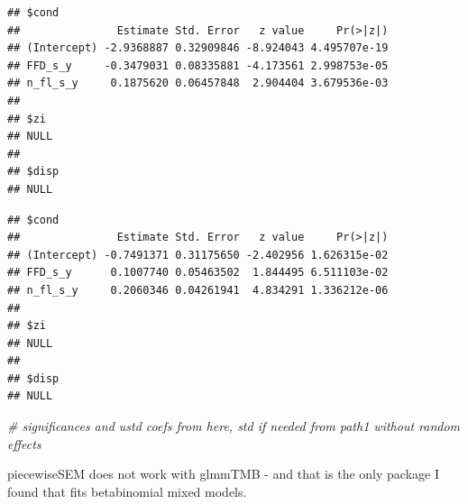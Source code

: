 \documentclass[
]{article}
\newenvironment{Shaded}{\begin{snugshade}}{\end{snugshade}}
\newcommand{\CommentTok}[1]{\textcolor[rgb]{0.56,0.35,0.01}{\textit{#1}}}
\newcommand{\KeywordTok}[1]{\textcolor[rgb]{0.13,0.29,0.53}{\textbf{#1}}}
\newcommand{\NormalTok}[1]{#1}
\newcommand{\OperatorTok}[1]{\textcolor[rgb]{0.81,0.36,0.00}{\textbf{#1}}}
\begin{document}
\begin{Shaded}
\end{Shaded}

\begin{verbatim}
## $cond
##               Estimate Std. Error   z value     Pr(>|z|)
## (Intercept) -2.9368887 0.32909846 -8.924043 4.495707e-19
## FFD_s_y     -0.3479031 0.08335881 -4.173561 2.998753e-05
## n_fl_s_y     0.1875620 0.06457848  2.904404 3.679536e-03
## 
## $zi
## NULL
## 
## $disp
## NULL
\end{verbatim}

\begin{Shaded}
\end{Shaded}

\begin{verbatim}
## $cond
##               Estimate Std. Error   z value     Pr(>|z|)
## (Intercept) -0.7491371 0.31175650 -2.402956 1.626315e-02
## FFD_s_y      0.1007740 0.05463502  1.844495 6.511103e-02
## n_fl_s_y     0.2060346 0.04261941  4.834291 1.336212e-06
## 
## $zi
## NULL
## 
## $disp
## NULL
\end{verbatim}

\begin{Shaded}
\begin{Highlighting}[]
\CommentTok{\# significances and ustd coefs from here, std if needed from path1 without random effects}
\end{Highlighting}
\end{Shaded}

piecewiseSEM does not work with glmmTMB - and that is the only package I
found that fits betabinomial mixed models.
\end{document}
